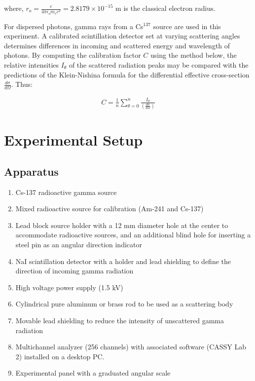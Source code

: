 where, $r_o=\frac{e}{4\pi\epsilon_om_ec^2} = 2.8179 \times 10^{-15}$ m is the classical electron radius.

For dispersed photons, gamma rays from a Cs$^{137}$ source are used in this experiment. A calibrated scintillation detector set at varying scattering angles determines differences in incoming and scattered energy and wavelength of photons. By computing the calibration factor $C$ using the method below, the relative intensities $I_\theta$ of the scattered radiation peaks may be compared with the predictions of the Klein-Nishina formula for the differential effective cross-section $\frac{d\sigma}{d\Omega}$. Thus:

\begin{align} C=\frac{1}{n}\sum_{\theta=0}^{n}\frac{I_\theta}{\left(\frac{d\sigma}{d\Omega}\right)}\end{align}

	
\section{Experimental Setup}

\subsection*{Apparatus}

\begin{enumerate}
    \item Cs-137 radioactive gamma source
    \item Mixed radioactive source for calibration (Am-241 and Cs-137)
    \item Lead block source holder with a 12 mm diameter hole at the center to accommodate radioactive sources, and an additional blind hole for inserting a steel pin as an angular direction indicator
    \item NaI scintillation detector with a holder and lead shielding to define the direction of incoming gamma radiation
    \item High voltage power supply (1.5 kV)
    \item Cylindrical pure aluminum or brass rod to be used as a scattering body
    \item Movable lead shielding to reduce the intensity of unscattered gamma radiation
    \item Multichannel analyzer (256 channels) with associated software (CASSY Lab 2) installed on a desktop PC.
    \item Experimental panel with a graduated angular scale\\
\end{enumerate}

